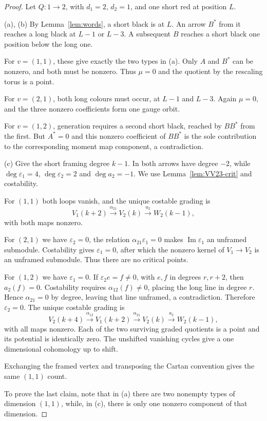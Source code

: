 \documentclass[11pt,reqno]{amsart}
\theoremstyle{definition}
\theoremstyle{remark}
\begin{document}
\begin{proof}
Let $Q:1\to2$, with $d_1=2$, $d_2=1$, and one short red
at position $L$.

(a), (b) By Lemma~\ref{lem:words}, a short black is at $L$.
An arrow $B^*$ from it reaches a long black at $L-1$ or $L-3$.
A subsequent $B$ reaches a short black one position below the long one. 

For $v=(1,1)$, these give exactly the two
types in (a). Only $A$ and $B^*$ can be nonzero, and both
must be nonzero. Thus $\mu=0$ and the quotient by the
rescaling torus is a point. 

For $v=(2,1)$, both long colours
must occur, at $L-1$ and $L-3$. Again $\mu=0$, and the
three nonzero coefficients form one gauge orbit.

For $v=(1,2)$, generation requires a second short black,
reached by $BB^*$ from the first. But $A^*=0$ and this
nonzero coefficient of $BB^*$ is the sole contribution to
the corresponding moment map component, a contradiction.

(c) Give the short framing degree $k-1$. In \cite{VV23}
both arrows have degree $-2$, while
$\deg\varepsilon_1=4$, $\deg\varepsilon_2=2$ and
$\deg a_2=-1$. We use Lemma~\ref{lem:VV23-crit} and costability.

For $(1,1)$ both loops vanish, and the unique costable grading is
\[
 V_1(k+2)\xrightarrow{\alpha_{21}}V_2(k)
 \xrightarrow{a_2}W_2(k-1),
\]
with both maps nonzero. 

For $(2,1)$ we have $\varepsilon_2=0$,
the relation $\alpha_{21}\varepsilon_1=0$ makes
$\operatorname{Im}\varepsilon_1$ an unframed submodule.
Costability gives $\varepsilon_1=0$, after which the
nonzero kernel of $V_1\to V_2$ is an unframed submodule.
Thus there are no critical points.

For $(1,2)$ we have $\varepsilon_1=0$. If
$\varepsilon_2 e=f\ne0$, with $e,f$ in degrees $r,r+2$,
then $a_2(f)=0$. Costability requires
$\alpha_{12}(f)\ne0$, placing the long line in degree
$r$. Hence $\alpha_{21}=0$ by degree, leaving that line
unframed, a contradiction. Therefore $\varepsilon_2=0$.
The unique costable grading is
\[
 V_2(k+4)\xrightarrow{\alpha_{12}}V_1(k+2)
 \xrightarrow{\alpha_{21}}V_2(k)
 \xrightarrow{a_2}W_2(k-1),
\]
with all maps nonzero. Each of the two surviving graded
quotients is a point and its potential is identically zero.
The unshifted vanishing cycles give a one dimensional
cohomology up to shift. 

Exchanging the framed vertex and
transposing the Cartan convention gives the same $(1,1)$ count.

To prove the last claim, note that in (a) there are two nonempty types of dimension $(1,1)$,
while, in  (c), there is only one nonzero component of that dimension. 
\end{proof}
\end{document}
